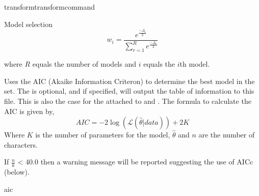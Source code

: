 \begin{command}{transform}{transformcommand}
\begin{arguments}
\begin {argumentgroup}{Model selection}
\begin{equation*}
w_{i} = \frac{e^{\frac{-\Delta_i}{2}}}
{\sum^R_{r=1} e^{\frac{-\Delta_r}{2}}}
\end{equation*}

where $R$ equals the number of models and $i$ equals the $i$th model. 

{Uses the AIC (Akaike Information Criteron) to determine
the best model in the set. The \poystring is optional, and if specified, 
\poy will output the table of information to this file. This is also the case
for the \poystring attached to  and .
The formula to calculate the
AIC is given by,
\begin{equation*}
AIC = - 2 \log(\mathcal{L}(\hat{\theta}|data)) + 2 K
\end{equation*}
Where $K$ is the number of parameters for the model,
$\hat{\theta}$ and $n$ are the number of characters. 
\begin{statement}
If $\frac{n}{k}$ < 40.0 then a warning message will be
reported suggesting the use of AICc (below).
\end{statement} }
{aic}


\end{argumentgroup}
\end{arguments}
\end{command}

